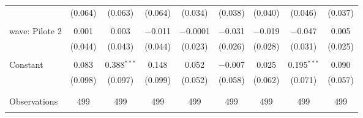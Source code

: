 \begin{tabular}{@{\extracolsep{5pt}}lcccccccc}
  & (0.064) & (0.063) & (0.064) & (0.034) & (0.038) & (0.040) & (0.046) & (0.037) \\ 
  & & & & & & & & \\ 
 wave: Pilote 2 & 0.001 & 0.003 & $-$0.011 & $-$0.0001 & $-$0.031 & $-$0.019 & $-$0.047 & 0.005 \\ 
  & (0.044) & (0.043) & (0.044) & (0.023) & (0.026) & (0.028) & (0.031) & (0.025) \\ 
  & & & & & & & & \\ 
 Constant & 0.083 & 0.388$^{***}$ & 0.148 & 0.052 & $-$0.007 & 0.025 & 0.195$^{***}$ & 0.090 \\ 
  & (0.098) & (0.097) & (0.099) & (0.052) & (0.058) & (0.062) & (0.071) & (0.057) \\ 
  & & & & & & & & \\ 
\hline \\[-1.8ex] 

Observations & 499 & 499 & 499 & 499 & 499 & 499 & 499 & 499 \\ 
\hline 
\hline \\[-1.8ex] 
\end{tabular} 
